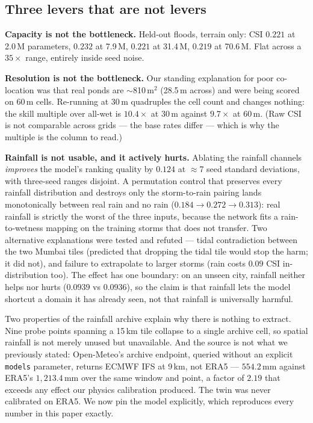 \documentclass[10pt]{article}
\begin{document}
\subsection{Three levers that are not levers}
\textbf{Capacity is not the bottleneck.} Held-out floods, terrain only: CSI $0.221$ at 2.0\,M
parameters, $0.232$ at 7.9\,M, $0.221$ at 31.4\,M, $0.219$ at 70.6\,M. Flat across a $35\times$
range, entirely inside seed noise.

\textbf{Resolution is not the bottleneck.} Our standing explanation for poor co-location was that
real ponds are $\sim$810\,m$^2$ (28.5\,m across) and were being scored on 60\,m cells. Re-running
at 30\,m quadruples the cell count and changes nothing: the skill multiple over all-wet is
$10.4\times$ at 30\,m against $9.7\times$ at 60\,m. (Raw CSI is not comparable across grids --- the
base rates differ --- which is why the multiple is the column to read.)

\textbf{Rainfall is not usable, and it actively hurts.} Ablating the rainfall channels
\emph{improves} the model's ranking quality by $0.124$ at $\approx$7 seed standard deviations,
with three-seed ranges disjoint. A permutation control that preserves every rainfall distribution
and destroys only the storm-to-rain pairing lands monotonically between real rain and no rain
($0.184 \to 0.272 \to 0.313$): real rainfall is strictly the worst of the three inputs, because
the network fits a rain-to-wetness mapping on the training storms that does not transfer. Two
alternative explanations were tested and refuted --- tidal contradiction between the two Mumbai
tiles (predicted that dropping the tidal tile would stop the harm; it did not), and failure to
extrapolate to larger storms (rain costs $0.09$ CSI in-distribution too). The effect has one
boundary: on an unseen city, rainfall neither helps nor hurts ($0.0939$ vs $0.0936$), so the
claim is that rainfall lets the model shortcut a domain it has already seen, not that rainfall is
universally harmful.

Two properties of the rainfall archive explain why there is nothing to extract. Nine probe points
spanning a 15\,km tile collapse to a single archive cell, so spatial rainfall is not merely
unused but unavailable. And the source is not what we previously stated: Open-Meteo's archive
endpoint, queried without an explicit \texttt{models} parameter, returns ECMWF IFS at 9\,km, not
ERA5 --- $554.2$\,mm against ERA5's $1{,}213.4$\,mm over the same window and point, a factor of
$2.19$ that exceeds any effect our physics calibration produced. The twin was never calibrated on
ERA5. We now pin the model explicitly, which reproduces every number in this paper exactly.
\end{document}
